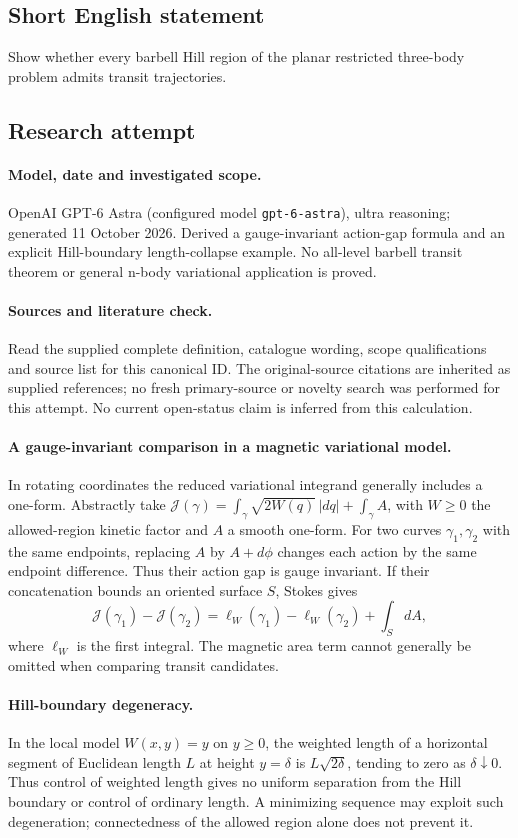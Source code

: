\documentclass[11pt]{article}
\begin{document}
\subsection{Short English statement}
Show whether every barbell Hill region of the planar restricted three-body problem admits transit trajectories.
\subsection{Research attempt}
\paragraph{Model, date and investigated scope.}
OpenAI GPT-6 Astra (configured model \texttt{gpt-6-astra}), ultra reasoning; generated 11 October 2026. Derived a gauge-invariant action-gap formula and an explicit Hill-boundary length-collapse example. No all-level barbell transit theorem or general n-body variational application is proved.

\paragraph{Sources and literature check.}
Read the supplied complete definition, catalogue wording, scope qualifications and source list for this canonical ID. The original-source citations are inherited as supplied references; no fresh primary-source or novelty search was performed for this attempt. No current open-status claim is inferred from this calculation.

\paragraph{A gauge-invariant comparison in a magnetic variational model.}In rotating coordinates the reduced variational integrand generally includes a one-form. Abstractly take \(\mathcal J(\gamma)=\int_\gamma\sqrt{2W(q)}\,|dq|+\int_\gamma A\), with \(W\ge0\) the allowed-region kinetic factor and \(A\) a smooth one-form. For two curves \(\gamma_1,\gamma_2\) with the same endpoints, replacing \(A\) by \(A+d\phi\) changes each action by the same endpoint difference. Thus their action gap is gauge invariant. If their concatenation bounds an oriented surface \(S\), Stokes gives
\[\mathcal J(\gamma_1)-\mathcal J(\gamma_2)=\ell_W(\gamma_1)-\ell_W(\gamma_2)+\int_SdA,
\]
where \(\ell_W\) is the first integral. The magnetic area term cannot generally be omitted when comparing transit candidates.
\paragraph{Hill-boundary degeneracy.}In the local model \(W(x,y)=y\) on \(y\ge0\), the weighted length of a horizontal segment of Euclidean length \(L\) at height \(y=\delta\) is \(L\sqrt{2\delta}\), tending to zero as \(\delta\downarrow0\). Thus control of weighted length gives no uniform separation from the Hill boundary or control of ordinary length. A minimizing sequence may exploit such degeneration; connectedness of the allowed region alone does not prevent it.
\end{document}
